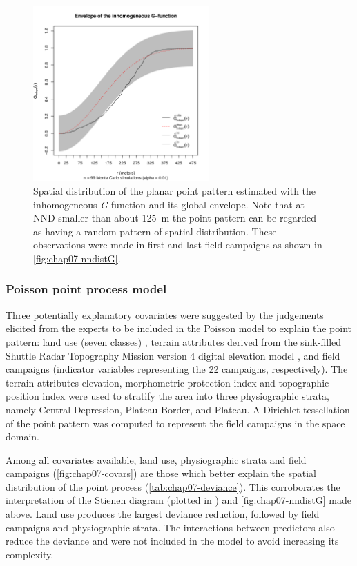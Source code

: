 \begin{figure}[!ht]
\centering
\includegraphics[trim=0mm 0mm 0mm 38mm, clip=true, width=0.6\textwidth]{fig/chap07-gest-sim}
\caption[Estimated inhomogeneous \emph{G} function and its global envelope.]{Spatial distribution of the planar 
point pattern estimated with the inhomogeneous \emph{G} function and its global envelope. Note that at NND 
smaller than about \SI{125}{\m} the point pattern can be regarded as having a random pattern of spatial 
distribution. These observations were made in first and last field campaigns as shown in 
\autoref{fig:chap07-nndistG}.}
\label{fig:chap07-gest}
\end{figure}

\subsubsection{Poisson point process model}

Three potentially explanatory covariates were suggested by the judgements elicited from the experts to be 
included in the Poisson model to explain the point pattern: land use (seven classes) 
\cite{SamuelRosaEtAl2011a}, terrain attributes derived from the sink-filled Shuttle Radar Topography Mission 
version \num{4} digital elevation model \cite{ReuterEtAl2007}, and field campaigns (indicator variables 
representing the 22 campaigns, respectively). The terrain attributes elevation, morphometric protection index 
and topographic position index were used to stratify the area into three physiographic strata, namely Central 
Depression, Plateau Border, and Plateau. A Dirichlet tessellation of the point pattern was computed to 
represent the field campaigns 
in the space domain.

Among all covariates available, land use, physiographic strata and field campaigns 
(\autoref{fig:chap07-covars}) are those which better explain the spatial distribution of the point process 
(\autoref{tab:chap07-deviance}). This corroborates the interpretation of the Stienen diagram (plotted in 
\googleearth) and \autoref{fig:chap07-nndistG} made above. Land use produces the largest deviance 
reduction, followed by field campaigns and physiographic strata. The interactions between predictors also 
reduce the deviance and were not included in the model to avoid increasing its complexity.

